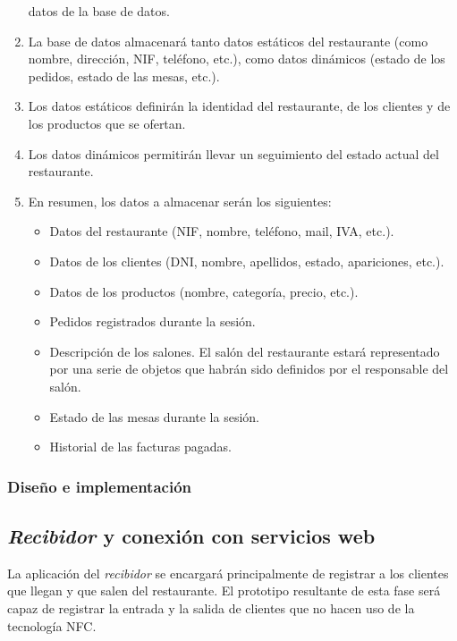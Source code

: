 \begin{enumerate}
datos de la base de datos.
\item La base de datos almacenará tanto datos estáticos del restaurante (como
nombre, dirección, NIF, teléfono, etc.), como datos dinámicos (estado de los 
pedidos, estado de las mesas, etc.).
\item Los datos estáticos definirán la identidad del restaurante, de los
clientes y de los productos que se ofertan.
\item Los datos dinámicos permitirán llevar un seguimiento del estado actual
del restaurante.
\item En resumen, los datos a almacenar serán los siguientes:
  \begin{itemize}
  \item Datos del restaurante (NIF, nombre, teléfono, mail, IVA, etc.).
  \item Datos de los clientes (DNI, nombre, apellidos, estado, apariciones,
  etc.).
  \item Datos de los productos (nombre, categoría, precio, etc.).
  \item Pedidos registrados durante la sesión.
  \item Descripción de los salones. El salón del restaurante estará
  representado por una serie de objetos que habrán sido definidos por el
  responsable del salón.
  \item Estado de las mesas durante la sesión.
  \item Historial de las facturas pagadas.
  \end{itemize}
\end{enumerate}

\subsubsection{Diseño e implementación}




\subsection{\emph{Recibidor} y conexión con servicios web}
La aplicación del \emph{recibidor} se encargará principalmente de registrar a
los clientes que llegan y que salen del restaurante. El prototipo resultante
de esta fase será capaz de registrar la entrada y la salida de clientes que no
hacen uso de la tecnología \acs{NFC}.

